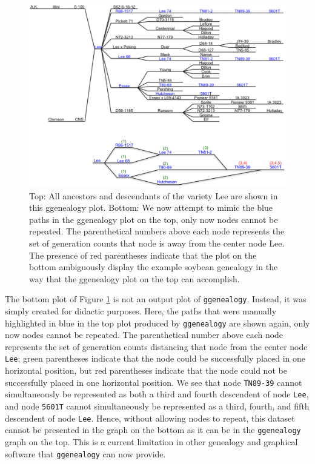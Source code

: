 \documentclass[11pt,a4paper,oldfontcommands,openany]{memoir}
\numberwithin{equation}{section} %
\newcommand{\code}[1]{{\texttt{#1}}}
\newcommand{\pkg}[1]{{\texttt{#1}}}
\begin{document}
\begin{figure}[H]
    \begin{framed}
    \centering
    \includegraphics[width=\textwidth]{LeeAD3}
    \end{framed}
    \caption{Top: All ancestors and descendants of the variety Lee are shown in this ggenealogy plot. Bottom: We now attempt to mimic the blue paths in the ggenealogy plot on the top, only now nodes cannot be repeated. The parenthetical numbers above each node represents the set of generation counts that node is away from the center node Lee. The presence of red parentheses indicate that the plot on the bottom ambiguously display the example soybean genealogy in the way that the ggenealogy plot on the top can accomplish.}
    \label{fig:Lee}
\end{figure}

The bottom plot of Figure \ref{fig:Lee} is not an output plot of \pkg{ggenealogy}. Instead, it was simply created for didactic purposes. Here, the paths that were manually highlighted in blue in the top plot produced by \pkg{ggenealogy} are shown again, only now nodes cannot be repeated. The parenthetical number above each node represents the set of generation counts distancing that node from the center node \code{Lee}; green parentheses indicate that the node could be successfully placed in one horizontal position, but red parentheses indicate that the node could not be successfully placed in one horizontal position. We see that node \code{TN89-39} cannot simultaneously be represented as both a third and fourth descendent of node \code{Lee}, and node \code{5601T} cannot simultaneously be represented as a third, fourth, and fifth descendent of node \code{Lee}. Hence, without allowing nodes to repeat, this dataset cannot be presented in the graph on the bottom as it can be in the \pkg{ggenealogy} graph on the top. This is a current limitation in other genealogy and graphical software that \pkg{ggenealogy} can now provide.
\end{document}
